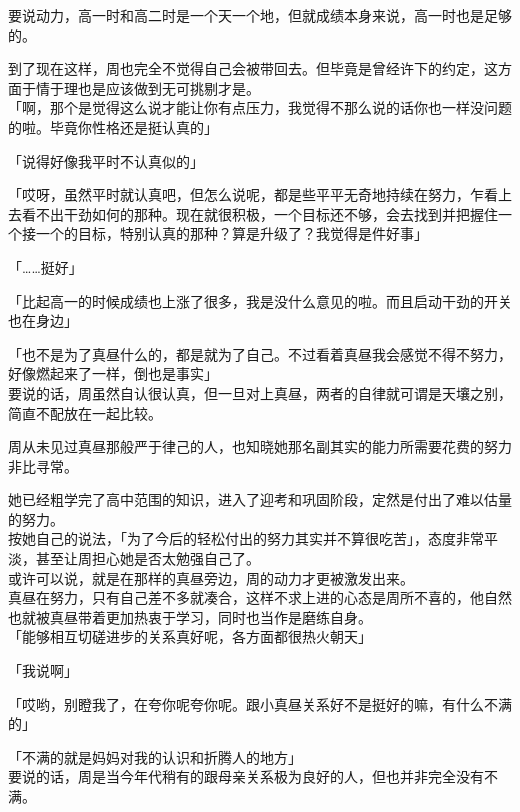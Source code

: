 要说动力，高一时和高二时是一个天一个地，但就成绩本身来说，高一时也是足够的。

到了现在这样，周也完全不觉得自己会被带回去。但毕竟是曾经许下的约定，这方面于情于理也是应该做到无可挑剔才是。\\

「啊，那个是觉得这么说才能让你有点压力，我觉得不那么说的话你也一样没问题的啦。毕竟你性格还是挺认真的」

「说得好像我平时不认真似的」

「哎呀，虽然平时就认真吧，但怎么说呢，都是些平平无奇地持续在努力，乍看上去看不出干劲如何的那种。现在就很积极，一个目标还不够，会去找到并把握住一个接一个的目标，特别认真的那种？算是升级了？我觉得是件好事」

「……挺好」

「比起高一的时候成绩也上涨了很多，我是没什么意见的啦。而且启动干劲的开关也在身边」

「也不是为了真昼什么的，都是就为了自己。不过看着真昼我会感觉不得不努力，好像燃起来了一样，倒也是事实」\\

要说的话，周虽然自认很认真，但一旦对上真昼，两者的自律就可谓是天壤之别，简直不配放在一起比较。

周从未见过真昼那般严于律己的人，也知晓她那名副其实的能力所需要花费的努力非比寻常。

她已经粗学完了高中范围的知识，进入了迎考和巩固阶段，定然是付出了难以估量的努力。\\

按她自己的说法，「为了今后的轻松付出的努力其实并不算很吃苦」，态度非常平淡，甚至让周担心她是否太勉强自己了。\\

或许可以说，就是在那样的真昼旁边，周的动力才更被激发出来。\\

真昼在努力，只有自己差不多就凑合，这样不求上进的心态是周所不喜的，他自然也就被真昼带着更加热衷于学习，同时也当作是磨练自身。\\

「能够相互切磋进步的关系真好呢，各方面都很热火朝天」

「我说啊」

「哎哟，别瞪我了，在夸你呢夸你呢。跟小真昼关系好不是挺好的嘛，有什么不满的」

「不满的就是妈妈对我的认识和折腾人的地方」\\

要说的话，周是当今年代稍有的跟母亲关系极为良好的人，但也并非完全没有不满。\\

